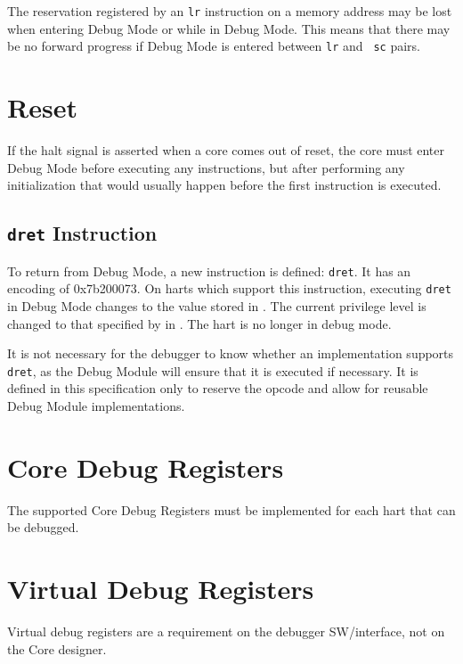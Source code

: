 The reservation registered by an {\tt lr} instruction on a memory address may
be lost when entering Debug Mode or while in Debug Mode.  This means that there
may be no forward progress if Debug Mode is entered between {\tt lr} and {\tt
sc} pairs.

\section{Reset}

If the halt signal is asserted when a core comes out of reset, the core must
enter Debug Mode before executing any instructions, but after performing any
initialization that would usually happen before the first instruction is
executed.

\subsection{{\tt dret} Instruction} \label{dret}

To return from Debug Mode, a new instruction is defined: {\tt dret}. It has an
encoding of 0x7b200073. On harts which support this instruction,
executing {\tt dret} in Debug Mode changes \Rpc to the value
stored in \Rdpc. The current privilege level is changed to that specified by
\Fprv in \Rdcsr. The hart is no longer in debug mode.

It is not necessary for the debugger to know whether an implementation supports
{\tt dret}, as the Debug Module will ensure that it is executed if necessary.
It is defined in this specification only to reserve the opcode and
allow for reusable Debug Module implementations.

\section{Core Debug Registers} \label{debreg}

The supported Core Debug Registers must be implemented for each hart that can
be debugged.



\section{Virtual Debug Registers} \label{virtreg}

Virtual debug registers are a requirement on the debugger SW/interface,
not on the Core designer.


